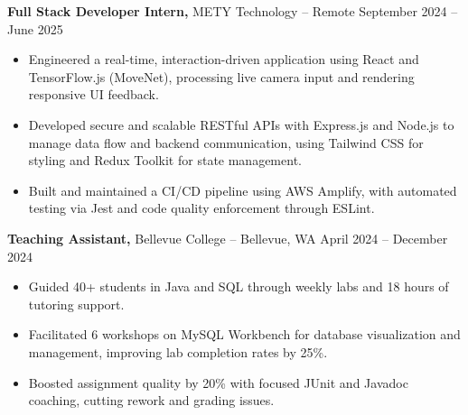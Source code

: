 \documentclass[11pt]{article}       %
\begin{document}
\textbf{Full Stack Developer Intern,} {METY Technology} -- Remote \hfill September 2024 -- June 2025
\vspace{-9pt}
\begin{itemize}
  \item Engineered a real-time, interaction-driven application using React and TensorFlow.js (MoveNet), processing live camera input and rendering responsive UI feedback.
  \item Developed secure and scalable RESTful APIs with Express.js and Node.js to manage data flow and backend communication, using Tailwind CSS for styling and Redux Toolkit for state management.
  \item Built and maintained a CI/CD pipeline using AWS Amplify, with automated testing via Jest and code quality enforcement through ESLint.
\end{itemize}

\textbf{Teaching Assistant,} {Bellevue College} -- Bellevue, WA \hfill April 2024 -- December 2024 \\
\vspace{-9pt}
\begin{itemize}
  \item Guided 40+ students in Java and SQL through weekly labs and 18 hours of tutoring support.
  \item Facilitated 6 workshops on MySQL Workbench for database visualization and management, improving lab completion rates by 25\%.
  \item Boosted assignment quality by 20\% with focused JUnit and Javadoc coaching, cutting rework and grading issues.
\end{itemize}
\end{document}
